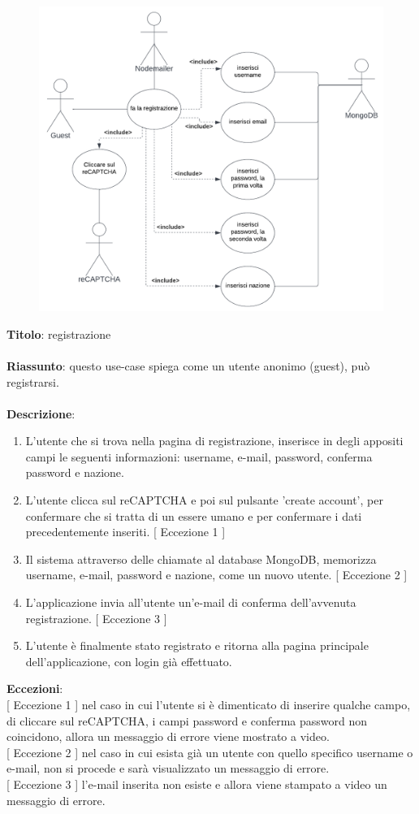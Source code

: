\begin{figure}[!h]
\centering
\includegraphics[scale=0.35]{images/use_case_registrazione.png}
\end{figure}
\noindent
\textbf{Titolo}: registrazione \\
\\
\textbf{Riassunto}: questo use-case spiega come un utente anonimo (guest), può registrarsi. \\
\\
\textbf{Descrizione}:
\begin{enumerate}
    \item L'utente che si trova nella pagina di registrazione, inserisce in degli appositi campi le seguenti informazioni: username, e-mail, password, conferma password e nazione.
    \item L'utente clicca sul reCAPTCHA e poi sul pulsante 'create account', per confermare che si tratta di un essere umano e per confermare i dati precedentemente inseriti. {[ Eccezione 1 ]}
    \item Il sistema attraverso delle chiamate al database MongoDB, memorizza username, e-mail, password e nazione, come un nuovo utente. {[ Eccezione 2 ]}
    \item L'applicazione invia all’utente un’e-mail di conferma dell’avvenuta registrazione. {[ Eccezione 3 ]}
    \item L'utente è finalmente stato registrato e ritorna alla pagina principale dell'applicazione, con login già effettuato. 
\end{enumerate}
\textbf{Eccezioni}: \\
{[ Eccezione 1 ]} nel caso in cui l'utente si è dimenticato di inserire qualche campo, di cliccare sul reCAPTCHA, i campi password e conferma password non coincidono, allora un messaggio di errore viene mostrato a video. \\
{[ Eccezione 2 ]} nel caso in cui esista già un utente con quello specifico username o e-mail, non si procede e sarà visualizzato un messaggio di errore. \\
{[ Eccezione 3 ]} l'e-mail inserita non esiste e allora viene stampato a video un messaggio di errore. 

